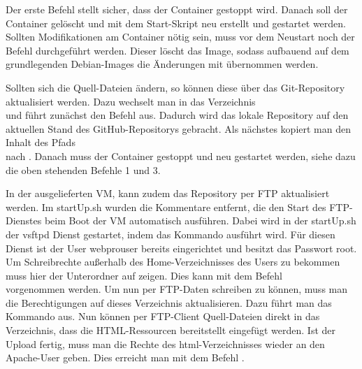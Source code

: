 Der erste Befehl stellt sicher, dass der Container gestoppt wird. Danach soll der Container gelöscht und mit dem Start-Skript neu erstellt und gestartet werden. Sollten Modifikationen am Container nötig sein, muss vor dem Neustart noch der Befehl  durchgeführt werden. Dieser löscht das Image, sodass aufbauend auf dem grundlegenden Debian-Images die Änderungen mit übernommen werden.\medskip

Sollten sich die Quell-Dateien ändern, so können diese über das Git-Repository aktualisiert werden. Dazu wechselt man in das Verzeichnis\\  und führt zunächst den Befehl  aus. Dadurch wird das lokale Repository auf den aktuellen Stand des GitHub-Repositorys gebracht. Als nächstes kopiert man den Inhalt des Pfads \\  nach . Danach muss der Container gestoppt und neu gestartet werden, siehe dazu die oben stehenden Befehle 1 und 3.\medskip

In der ausgelieferten VM, kann zudem das Repository per FTP aktualisiert werden. Im startUp.sh wurden die Kommentare entfernt, die den Start des FTP-Dienstes beim Boot der VM automatisch ausführen. Dabei wird in der startUp.sh der vsftpd Dienst gestartet, indem das Kommando  ausführt wird. Für diesen Dienst ist der User webprouser bereits eingerichtet und besitzt das Passwort root. Um Schreibrechte außerhalb des Home-Verzeichnisses des Users zu bekommen muss hier der Unterordner  auf  zeigen. Dies kann mit dem Befehl\\  vorgenommen werden. Um nun per FTP-Daten schreiben zu können, muss man die Berechtigungen auf dieses Verzeichnis aktualisieren. Dazu führt man das Kommando  aus. Nun können per FTP-Client Quell-Dateien direkt in das Verzeichnis, dass die HTML-Ressourcen bereitstellt eingefügt werden. Ist der Upload fertig, muss man die Rechte des html-Verzeichnisses wieder an den Apache-User geben. Dies erreicht man mit dem Befehl .